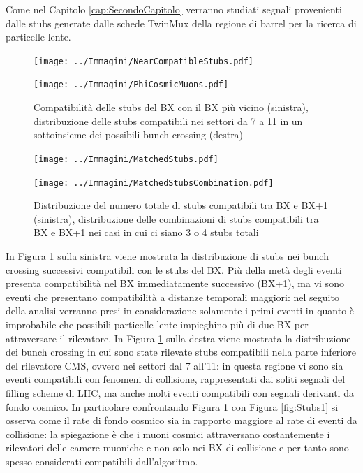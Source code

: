 Come nel Capitolo \ref{cap:SecondoCapitolo} verranno studiati segnali provenienti dalle stubs generate dalle schede TwinMux della regione di barrel per la ricerca di particelle lente.


\begin{figure}[t]
  \centering
  \begin{minipage}[b]{0.48\textwidth}
    \centering
    \texttt{[image: ../Immagini/NearCompatibleStubs.pdf]} 
    \end{minipage}
    \hfill 
    \begin{minipage}[b]{0.48\textwidth}
      \centering
      \texttt{[image: ../Immagini/PhiCosmicMuons.pdf]} 
    \end{minipage}
    \caption{Compatibilità delle stubs del BX con il BX più vicino (sinistra), distribuzione delle stubs compatibili nei settori da 7 a 11 in un sottoinsieme dei possibili bunch crossing (destra)}
  \label{fig:MatchedStubsRate}
\end{figure}



\begin{figure}[t]
  \centering
  \begin{minipage}[b]{0.49\textwidth}
    \centering
    \texttt{[image: ../Immagini/MatchedStubs.pdf]} 
    \end{minipage}
    \hfill 
    \begin{minipage}[b]{0.49\textwidth}
      \centering
      \texttt{[image: ../Immagini/MatchedStubsCombination.pdf]} 
    \end{minipage}
    \caption{Distribuzione del numero totale di stubs compatibili tra BX e BX+1 (sinistra), distribuzione delle combinazioni di stubs compatibili tra BX e BX+1 nei casi in cui ci siano 3 o 4 stubs totali}
  \label{fig:MatchedStubsCombination}
\end{figure}

In Figura \ref{fig:MatchedStubsRate} sulla sinistra viene mostrata la distribuzione di stubs nei bunch crossing successivi compatibili con le stubs del BX. Più della metà degli eventi presenta compatibilità nel BX immediatamente successivo (BX+1), ma vi sono eventi che presentano compatibilità a distanze temporali maggiori: nel seguito della analisi verranno presi in considerazione solamente i primi eventi in quanto è improbabile che possibili particelle lente impieghino più di due BX per attraversare il rilevatore. \newline
In Figura \ref{fig:MatchedStubsRate} sulla destra viene mostrata la distribuzione dei bunch crossing in cui sono state rilevate stubs compatibili nella parte inferiore del rilevatore CMS, ovvero nei settori dal 7 all'11: in questa regione vi sono sia eventi compatibili con fenomeni di collisione, rappresentati dai soliti segnali del filling scheme di LHC, ma anche molti eventi compatibili con segnali derivanti da fondo cosmico. In particolare confrontando Figura \ref{fig:MatchedStubsRate} con Figura \ref{fig:Stubs1} si osserva come il rate di fondo cosmico sia in rapporto maggiore al rate di eventi da collisione: la spiegazione è che i muoni cosmici attraversano costantemente i rilevatori delle camere muoniche e non solo nei BX di collisione e per tanto sono spesso considerati compatibili dall'algoritmo.

